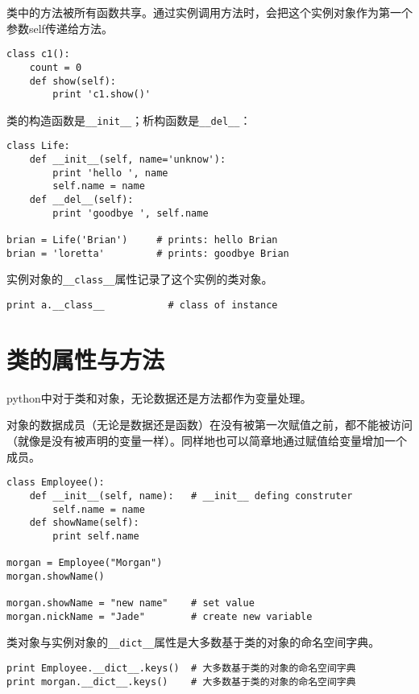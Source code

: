 类中的方法被所有函数共享。通过实例调用方法时，会把这个实例对象作为第一个参数self传递给方法。

\begin{lstlisting}
class c1():
	count = 0
	def show(self):
		print 'c1.show()'
\end{lstlisting}

类的构造函数是\verb|__init__|；析构函数是\verb|__del__|：

\begin{lstlisting}
class Life:
	def __init__(self, name='unknow'):
		print 'hello ', name
		self.name = name
	def __del__(self):
		print 'goodbye ', self.name

brian = Life('Brian')     # prints: hello Brian
brian = 'loretta'         # prints: goodbye Brian
\end{lstlisting}

		实例对象的\verb|__class__|属性记录了这个实例的类对象。

\begin{lstlisting}
print a.__class__           # class of instance
\end{lstlisting}

\section{类的属性与方法}

python中对于类和对象，无论数据还是方法都作为变量处理。

对象的数据成员（无论是数据还是函数）在没有被第一次赋值之前，都不能被访问（就像是没有被声明的变量一样）。同样地也可以简章地通过赋值给变量增加一个成员。

\begin{lstlisting}
class Employee():
	def __init__(self, name):   # __init__ defing construter
		self.name = name
	def showName(self):
		print self.name

morgan = Employee("Morgan")
morgan.showName()

morgan.showName = "new name"    # set value
morgan.nickName = "Jade"        # create new variable
\end{lstlisting}

类对象与实例对象的\verb|__dict__|属性是大多数基于类的对象的命名空间字典。

\begin{lstlisting}
print Employee.__dict__.keys()  # 大多数基于类的对象的命名空间字典
print morgan.__dict__.keys()    # 大多数基于类的对象的命名空间字典
\end{lstlisting}

